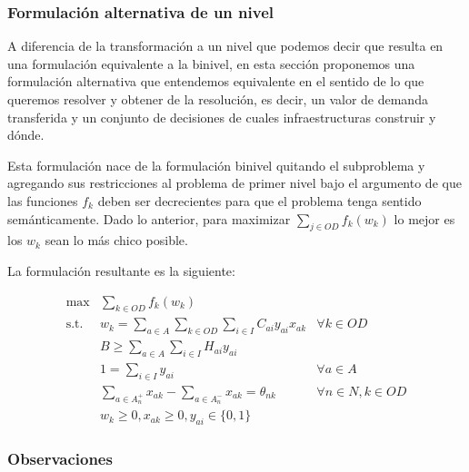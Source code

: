 \documentclass{article}
\begin{document}
  \subsubsection{Formulación alternativa de un nivel}
  \label{altOneLevelFormulation}

  A diferencia de la transformación a un nivel que podemos decir que resulta en una formulación equivalente a la binivel, en esta sección proponemos una formulación alternativa que entendemos equivalente en el sentido de lo que queremos resolver y obtener de la resolución, es decir, un valor de demanda transferida y un conjunto de decisiones de cuales infraestructuras construir y dónde.

  Esta formulación nace de la formulación binivel quitando el subproblema y agregando sus restricciones al problema de primer nivel bajo el argumento de que las funciones $f_k$ deben ser decrecientes para que el problema tenga sentido semánticamente. Dado lo anterior, para maximizar $\sum_{j \in OD}f_k(w_k)$ lo mejor es los $w_k$ sean lo más chico posible.

  La formulación resultante es la siguiente:

  \begin{align}
    \text{max}    & \sum_{k \in OD} f_k(w_k)                                                         & \label{eq:objectivealt} \\
    \text{s.t.}\; & w_k = \sum_{a \in A} \sum_{k \in OD} \sum_{i \in I} C_{ai}y_{ai}x_{ak}           & \forall k \in OD \label{eq:shortestpathalt} \\
                  & B \geq \sum_{a \in A} \sum_{i \in I} H_{ai}y_{ai}                                & \label{eq:respectbudgetalt} \\
                  & 1 = \sum_{i \in I} y_{ai}                                                        & \forall a \in A \label{eq:alwaysoneyalt} \\
                  & \sum_{a \in A_n^+} x_{ak} - \sum_{a \in A_n^-} x_{ak} = \theta_{nk}              & \forall n \in N, k \in OD \label{eq:flowbalancealt} \\
                  & w_k \geq 0, x_{ak} \geq 0, y_{ai} \in \{0,1\}                                    & \nonumber
  \end{align}

  \subsubsection*{Observaciones}
\end{document}
